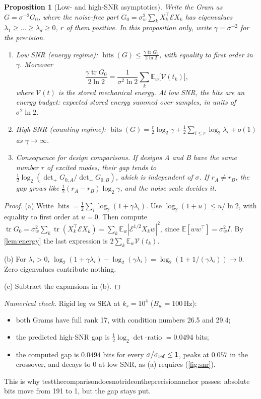 \documentclass[11pt]{article}
\newtheorem{proposition}[theorem]{Proposition}
\theoremstyle{definition}
\theoremstyle{remark}
\newcommand{\E}{\mathbb{E}}
\newcommand{\tr}{\operatorname{tr}}
\newcommand{\bits}{\operatorname{bits}}
\newcommand{\Em}{\mathcal{E}}         %
\newcommand{\codeus}{\textunderscore\allowbreak}
\newcommand{\code}[1]{{\ttfamily\let\_\codeus\hyphenchar\font=-1 #1}}
\newcommand{\checked}[1]{\par\smallskip\noindent\textit{Numerical check.} #1\par}
\begin{document}
\begin{proposition}[Low- and high-SNR asymptotics]\label{prop:snr}
Write the Gram as $G=\sigma^{-2}G_0$, where the noise-free part
$G_0=\sigma_w^2\sum_kX_k^\top\Em X_k$ has eigenvalues $\lambda_1\ge\dots\ge\lambda_d\ge0$,
$r$ of them positive. In this proposition only, write $\gamma=\sigma^{-2}$ for the
precision.
\begin{enumerate}[label=(\alph*)]
  \item \emph{Low SNR (energy regime):}
        $\bits(G)\le\frac{\gamma\tr G_0}{2\ln2}$, with equality to first order in
        $\gamma$. Moreover
        \[
          \frac{\gamma\tr G_0}{2\ln2}
          =\frac{1}{\sigma^2\ln2}\sum_k\E_w\big[\mathcal V(t_k)\big],
        \]
        where $\mathcal V(t)$ is the stored mechanical energy. At low SNR, the bits
        \emph{are} an energy budget: expected stored energy summed over samples, in units
        of $\sigma^2\ln2$.
  \item \emph{High SNR (counting regime):}
        $\bits(G)=\frac r2\log_2\gamma+\frac12\sum_{i\le r}\log_2\lambda_i+o(1)$ as
        $\gamma\to\infty$.
  \item \emph{Consequence for design comparisons.} If designs A and B have the same
        number $r$ of excited modes, their gap tends to
        $\frac12\log_2(\det_+G_{0,A}/\det_+G_{0,B})$, which is \emph{independent of
        $\sigma$}. If $r_A\neq r_B$, the gap grows like $\frac12(r_A-r_B)\log_2\gamma$,
        and the noise scale decides it.
\end{enumerate}
\end{proposition}
\begin{proof}
(a) Write $\bits=\frac12\sum_i\log_2(1+\gamma\lambda_i)$. Use $\log_2(1+u)\le u/\ln2$,
with equality to first order at $u=0$. Then compute
$\tr G_0=\sigma_w^2\sum_k\tr(X_k^\top\Em X_k)=\sum_k\E_w|\Em^{1/2}X_kw|^2$, since
$\E[ww^\top]=\sigma_w^2I$. By \cref{lem:energy} the last expression is
$2\sum_k\E_w\mathcal V(t_k)$.

(b) For $\lambda_i>0$,
$\log_2(1+\gamma\lambda_i)-\log_2(\gamma\lambda_i)=\log_2(1+1/(\gamma\lambda_i))\to0$.
Zero eigenvalues contribute nothing.

(c) Subtract the expansions in (b).
\end{proof}

\checked{Rigid leg vs SEA at $k_s=10^4$ ($B_w=100$\,Hz):
\begin{itemize}[nosep]
  \item both Grams have full rank 17, with condition numbers 26.5 and 29.4;
  \item the predicted high-SNR gap is $\frac12\log_2\det$-ratio $=0.0494$ bits;
  \item the computed gap is $0.0494$ bits for every $\sigma/\sigma_{\rm ref}\le1$, peaks
        at $0.057$ in the crossover, and decays to 0 at low SNR, as (a) requires
        (\cref{fig:snr}).
\end{itemize}
This is why \code{test\_the\_comparison\_does\_not\_ride\_on\_the\_precision\_anchor} passes:
absolute bits move from 191 to 1, but the gap stays put.}
\end{document}

